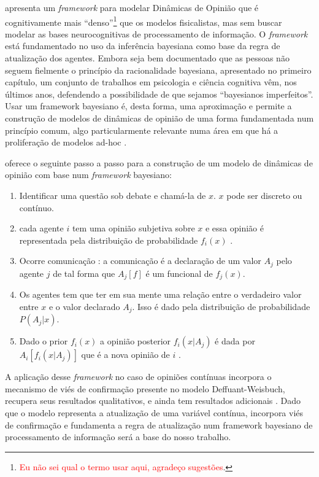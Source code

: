  apresenta um \textit{framework} para modelar
Dinâmicas de Opinião que é cognitivamente mais
``denso''\footnote{\textcolor{red}{Eu não sei qual o termo usar aqui, agradeço
    sugestões}. } que os modelos fisicalistas, mas sem buscar modelar as bases
neurocognitivas de processamento de informação. O \textit{framework} está
fundamentado no uso da inferência bayesiana como base da regra de atualização
dos agentes. Embora seja bem documentado que as pessoas não seguem fielmente o
princípio da racionalidade bayesiana, apresentado no primeiro capítulo, um
conjunto de trabalhos em psicologia e ciência cognitiva vêm, nos últimos anos,
defendendo a possibilidade de que sejamos ``bayesianos
imperfeitos''\cite{griffiths2006optimal,fujikawa2007perfect,baker2017rational,
  gintis2016individuality}. Usar um framework bayesiano é, desta forma, uma
aproximação e permite a construção de modelos de dinâmicas de opinião de uma
forma fundamentada num princípio comum, algo particularmente relevante numa área
em que há a proliferação de modelos ad-hoc \cite{flache2017,jager2017}.

  oferece o seguinte passo a passo
para a construção de um modelo de dinâmicas de opinião com base num
\textit{framework} bayesiano:

\begin{enumerate}
\item Identificar uma questão sob debate e chamá-la de $x$. \(x\) pode ser
  discreto ou contínuo.
\item cada agente \(i\) tem uma opinião subjetiva sobre $x$ e essa opinião é
  representada pela distribuição de probabilidade $f_i(x)$ .
\item Ocorre comunicação : a comunicação é a declaração de um valor
  $ A_j$ pelo agente $j$ de tal forma que $A_j[f]$ é um funcional de
  $f_j(x)$.
\item Os agentes tem que ter em sua mente  uma relação entre o
  verdadeiro valor entre $x$ e o valor declarado $A_j$. Isso é dado
  pela distribuição de probabilidade $P(A_j|x)$.
\item Dado o prior $f_i(x)$ a opinião posterior $f_i(x|A_j)$ é dada
  por $A_i[f_i(x|A_j)]$ que é a nova opinião de $i$ .
\end{enumerate}




A aplicação desse \textit{framework} no caso de opiniões contínuas incorpora o
mecanismo de viés de confirmação presente no modelo  Deffuant-Weisbuch,
recupera seus resultados qualitativos, e ainda tem resultados adicionais
\cite{martins2009bayesian}. Dado que o modelo representa a atualização de uma
variável contínua, incorpora viés de confirmação e fundamenta a regra de
atualização num framework bayesiano de processamento de informação será a base
do nosso trabalho. 

